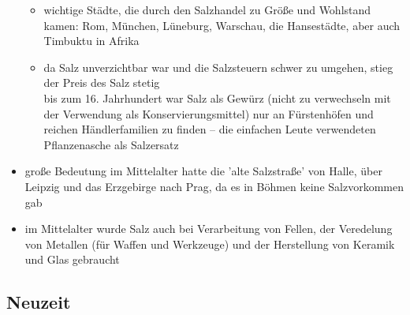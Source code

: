 \documentclass[11pt,a4paper]{article}
\begin{document}
\begin{itemize}
\begin{itemize}
	\item wichtige Städte, die durch den Salzhandel zu Größe und Wohlstand kamen: Rom, München, Lüneburg, Warschau, die Hansestädte, aber auch Timbuktu in Afrika
	
	\item da Salz unverzichtbar war und die Salzsteuern schwer zu umgehen, stieg der Preis des Salz stetig\\
	 bis zum 16. Jahrhundert war Salz als Gewürz (nicht zu verwechseln mit der Verwendung als Konservierungsmittel) nur an Fürstenhöfen und reichen Händlerfamilien zu finden -- die einfachen Leute verwendeten Pflanzenasche als Salzersatz
	\end{itemize}

\item große Bedeutung im Mittelalter hatte die 'alte Salzstraße' von Halle, über Leipzig und das Erzgebirge nach Prag, da es in Böhmen keine Salzvorkommen gab

\item im Mittelalter wurde Salz auch bei Verarbeitung von Fellen, der Veredelung von Metallen (für Waffen und Werkzeuge) und der Herstellung von Keramik und Glas gebraucht


\end{itemize}


\subsection*{\textsf{Neuzeit}}
\end{document}
